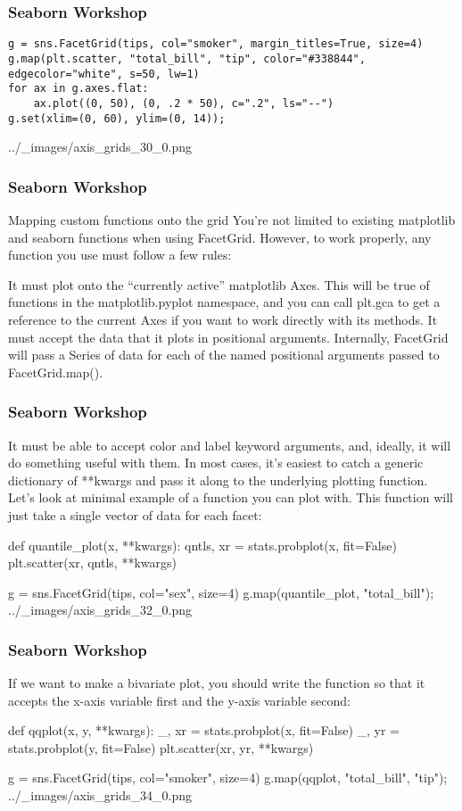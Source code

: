 \begin{frame}[fragile]
\frametitle{Seaborn Workshop}
\large
\begin{verbatim}
g = sns.FacetGrid(tips, col="smoker", margin_titles=True, size=4)
g.map(plt.scatter, "total_bill", "tip", color="#338844", edgecolor="white", s=50, lw=1)
for ax in g.axes.flat:
    ax.plot((0, 50), (0, .2 * 50), c=".2", ls="--")
g.set(xlim=(0, 60), ylim=(0, 14));
\end{verbatim}
../_images/axis_grids_30_0.png

\end{frame}
\begin{frame}[fragile]
\frametitle{Seaborn Workshop}
\large

Mapping custom functions onto the grid
You’re not limited to existing matplotlib and seaborn functions when using FacetGrid. However, to work properly, any function you use must follow a few rules:

It must plot onto the “currently active” matplotlib Axes. This will be true of functions in the matplotlib.pyplot namespace, and you can call plt.gca to get a reference to the current Axes if you want to work directly with its methods.
It must accept the data that it plots in positional arguments. Internally, FacetGrid will pass a Series of data for each of the named positional arguments passed to FacetGrid.map().
\end{frame}
\begin{frame}[fragile]
\frametitle{Seaborn Workshop}
\large
It must be able to accept color and label keyword arguments, and, ideally, it will do something useful with them. In most cases, it’s easiest to catch a generic dictionary of **kwargs and pass it along to the underlying plotting function.
Let’s look at minimal example of a function you can plot with. This function will just take a single vector of data for each facet:

def quantile_plot(x, **kwargs):
    qntls, xr = stats.probplot(x, fit=False)
    plt.scatter(xr, qntls, **kwargs)

g = sns.FacetGrid(tips, col="sex", size=4)
g.map(quantile_plot, "total_bill");
../_images/axis_grids_32_0.png

\end{frame}
\begin{frame}[fragile]
\frametitle{Seaborn Workshop}
\large
If we want to make a bivariate plot, you should write the function so that it accepts the x-axis variable first and the y-axis variable second:

def qqplot(x, y, **kwargs):
    _, xr = stats.probplot(x, fit=False)
    _, yr = stats.probplot(y, fit=False)
    plt.scatter(xr, yr, **kwargs)

g = sns.FacetGrid(tips, col="smoker", size=4)
g.map(qqplot, "total_bill", "tip");
../_images/axis_grids_34_0.png
\end{frame}
